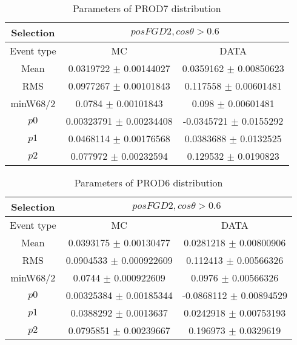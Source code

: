 \documentclass[a4paper,12pt]{article}
\begin{document}
\begin{table}[htbp]
\begin{center}
\begin{tabular}{|c|c|c|}
        \hline
        Selection & \multicolumn{2}{|c|}{$posFGD2, cos\theta>0.6$}  \\ \hline
        Event type & MC & DATA \\ 
        \hline
        Mean & 0.0319722 $\pm$ 0.00144027 & 0.0359162 $\pm$ 0.00850623 \\ 
        \hline 
        RMS & 0.0977267 $\pm$ 0.00101843 & 0.117558 $\pm$ 0.00601481 \\ 
        \hline 
        minW68/2 & 0.0784 $\pm$ 0.00101843 & 0.098 $\pm$ 0.00601481 \\ 
        \hline 
        $p0$ & 0.00323791 $\pm$ 0.00234408 & -0.0345721 $\pm$ 0.0155292 \\ 
        \hline 
        $p1$ & 0.0468114 $\pm$ 0.00176568 & 0.0383688 $\pm$ 0.0132525 \\ 
        \hline 
        $p2$ & 0.077972 $\pm$ 0.00232594 & 0.129532 $\pm$ 0.0190823 \\ 
        \hline 
\end{tabular}
\caption{Parameters of PROD7 distribution } \vspace{0.2in}
\label{xxx}
\end{center}
\end{table}
\begin{table}[htbp]
\begin{center}
\begin{tabular}{|c|c|c|}
        \hline
        Selection & \multicolumn{2}{|c|}{$posFGD2, cos\theta>0.6$}  \\ \hline
        Event type & MC & DATA \\ 
        \hline
        Mean & 0.0393175 $\pm$ 0.00130477 & 0.0281218 $\pm$ 0.00800906 \\ 
        \hline 
        RMS & 0.0904533 $\pm$ 0.000922609 & 0.112413 $\pm$ 0.00566326 \\ 
        \hline 
        minW68/2 & 0.0744 $\pm$ 0.000922609 & 0.0976 $\pm$ 0.00566326 \\ 
        \hline 
        $p0$ & 0.00325384 $\pm$ 0.00185344 & -0.0868112 $\pm$ 0.00894529 \\ 
        \hline 
        $p1$ & 0.0388292 $\pm$ 0.0013637 & 0.0242918 $\pm$ 0.00753193 \\ 
        \hline 
        $p2$ & 0.0795851 $\pm$ 0.00239667 & 0.196973 $\pm$ 0.0329619 \\ 
        \hline 
\end{tabular}
\caption{Parameters of PROD6 distribution } \vspace{0.2in}
\label{xxx}
\end{center}
\end{table}
\end{document}
